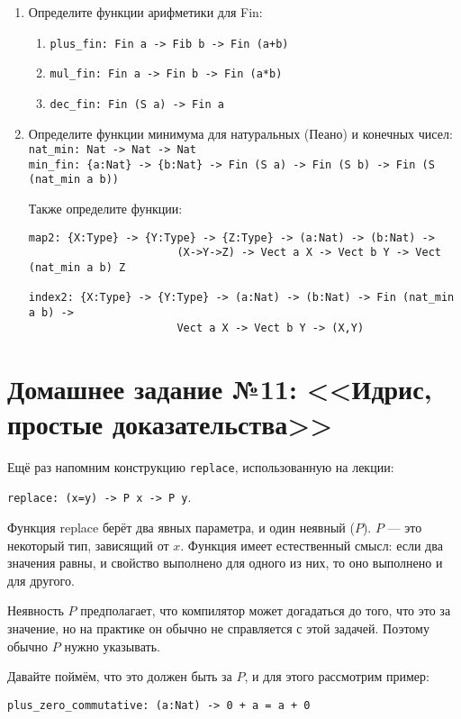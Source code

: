 \documentclass[10pt,a4paper,oneside]{article}
\begin{document}
\begin{enumerate}
\item Определите функции арифметики для Fin:
\begin{enumerate}
\item \verb!plus_fin: Fin a -> Fib b -> Fin (a+b)!\\
\item \verb!mul_fin: Fin a -> Fin b -> Fin (a*b)!\\
\item \verb!dec_fin: Fin (S a) -> Fin a!
\end{enumerate}

\item Определите функции минимума для натуральных (Пеано) и конечных чисел:\\
\verb!nat_min: Nat -> Nat -> Nat!\\
\verb!min_fin: {a:Nat} -> {b:Nat} -> Fin (S a) -> Fin (S b) -> Fin (S (nat_min a b))!

Также определите функции:
\begin{verbatim}
map2: {X:Type} -> {Y:Type} -> {Z:Type} -> (a:Nat) -> (b:Nat) -> 
                       (X->Y->Z) -> Vect a X -> Vect b Y -> Vect (nat_min a b) Z

index2: {X:Type} -> {Y:Type} -> (a:Nat) -> (b:Nat) -> Fin (nat_min a b) ->
                       Vect a X -> Vect b Y -> (X,Y)
\end{verbatim}

\end{enumerate}

\section*{Домашнее задание №11: <<Идрис, простые доказательства>>}
Ещё раз напомним конструкцию \verb!replace!, использованную на лекции:

\verb!replace: (x=y) -> P x -> P y!.

Функция replace берёт два явных параметра, и один неявный ($P$).
$P$ --- это некоторый тип, зависящий от $x$. Функция имеет естественный 
смысл: если два значения равны, и свойство выполнено для одного из них, 
то оно выполнено и для другого.

Неявность $P$ предполагает, что компилятор может догадаться до того, что
это за значение, но на практике он обычно не справляется с этой задачей. 
Поэтому обычно $P$ нужно указывать.

Давайте поймём, что это должен быть за $P$, и для этого рассмотрим 
пример:

\verb!plus_zero_commutative: (a:Nat) -> 0 + a = a + 0!
\end{document}
